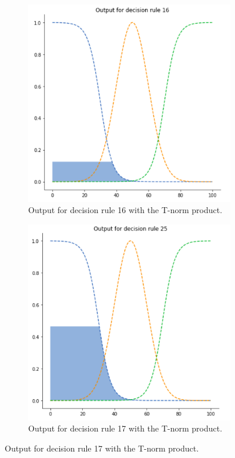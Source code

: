 \begin{figure}[ht]
\begin{subfigure}{.5\textwidth}
  \centering
  \includegraphics[width=.8\linewidth]{figures/first/prod1.png}  
  \caption{Output for decision rule 16 with the T-norm product.}
  \label{fig:1prod1}
\end{subfigure}
\begin{subfigure}{.5\textwidth}
  \centering
  \includegraphics[width=.8\linewidth]{figures/first/prod2.png}  
  \caption{Output for decision rule 17 with the T-norm product.}
  \label{fig:1prod2}
\end{subfigure}

\end{figure}
